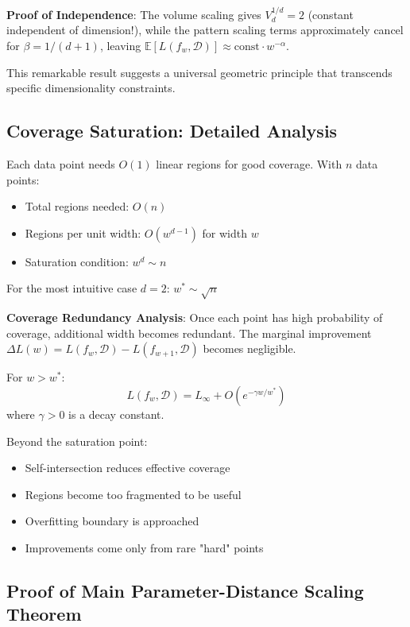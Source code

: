 \textbf{Proof of Independence}: The volume scaling gives $V_d^{1/d} = 2$ (constant independent of dimension!), while the pattern scaling terms approximately cancel for $\beta = 1/(d+1)$, leaving $\mathbb{E}[L(f_w, \mathcal{D})] \approx \text{const} \cdot w^{-\alpha}$.

This remarkable result suggests a universal geometric principle that transcends specific dimensionality constraints.

\subsection{Coverage Saturation: Detailed Analysis}
\label{subsec:coverage-saturation-detailed}

\begin{lemma}
Each data point needs $O(1)$ linear regions for good coverage. With $n$ data points:
\begin{itemize}
    \item Total regions needed: $O(n)$
    \item Regions per unit width: $O(w^{d-1})$ for width $w$
    \item Saturation condition: $w^d \sim n$
\end{itemize}
For the most intuitive case $d = 2$: $w^* \sim \sqrt{n}$
\end{lemma}

\textbf{Coverage Redundancy Analysis}: Once each point has high probability of coverage, additional width becomes redundant. The marginal improvement $\Delta L(w) = L(f_w, \mathcal{D}) - L(f_{w+1}, \mathcal{D})$ becomes negligible.

\begin{theorem}
For $w > w^*$:
$$L(f_w, \mathcal{D}) = L_\infty + O(e^{-\gamma w/w^*})$$
where $\gamma > 0$ is a decay constant.
\end{theorem}

Beyond the saturation point:
\begin{itemize}
    \item Self-intersection reduces effective coverage
    \item Regions become too fragmented to be useful
    \item Overfitting boundary is approached
    \item Improvements come only from rare "hard" points
\end{itemize}

\subsection{Proof of Main Parameter-Distance Scaling Theorem}
\label{subsec:main-theorem-proof}


